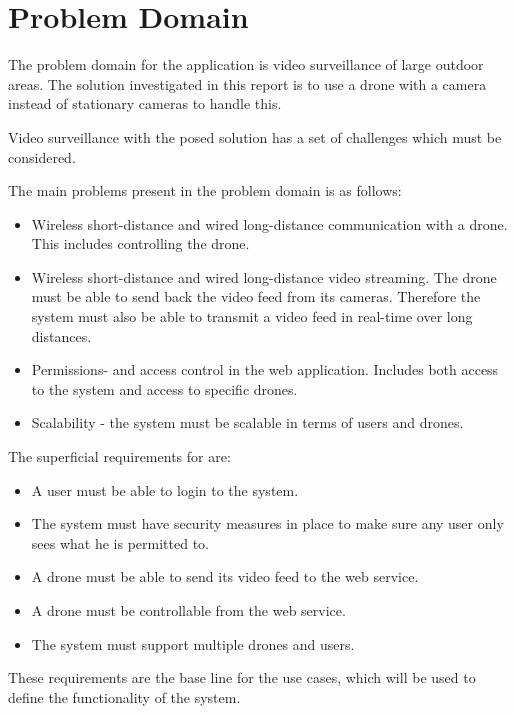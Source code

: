\section{Problem Domain}\label{problem_domain}
The problem domain for the application is video surveillance of large outdoor areas.
The solution investigated in this report is to use a drone with a camera instead of stationary cameras to handle this. 

Video surveillance with the posed solution has a set of challenges which must be considered.

The main problems present in the problem domain is as follows:
\begin{itemize}
	\item Wireless short-distance and wired long-distance communication with a drone. This includes controlling the drone.
	\item Wireless short-distance and wired long-distance video streaming. The drone must be able to send back the video feed from its cameras. Therefore the system must also be able to transmit a video feed in real-time over long distances. 
	\item Permissions- and access control in the web application. Includes both access to the system and access to specific drones.
	\item Scalability - the system must be scalable in terms of users and drones.
\end{itemize}

The superficial requirements for \projectname{} are:

\begin{itemize}
	\item A user must be able to login to the system.
	\item The system must have security measures in place to make sure any user only sees what he is permitted to. 
	\item A drone must be able to send its video feed to the web service.
	\item A drone must be controllable from the web service. 
	\item The system must support multiple drones and users. 
\end{itemize}

These requirements are the base line for the use cases, which will be used to define the functionality of the system. 
